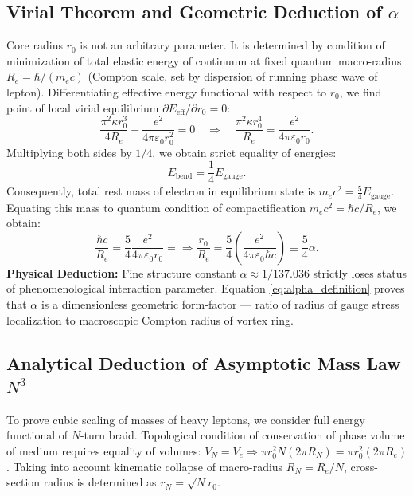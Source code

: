 \documentclass[12pt,a4paper]{article}
\begin{document}
\subsection{Virial Theorem and Geometric Deduction of $\alpha$}
Core radius $r_0$ is not an arbitrary parameter. It is determined by condition of minimization of total elastic energy of continuum at fixed quantum macro-radius $R_e = \hbar/(m_ec)$ (Compton scale, set by dispersion of running phase wave of lepton). Differentiating effective energy functional with respect to $r_0$, we find point of local virial equilibrium $\partial E_{\text{eff}}/\partial r_0 = 0$:
\begin{equation}
    \frac{\pi^2 \kappa r_0^3}{4R_e} - \frac{e^2}{4\pi\varepsilon_0 r_0^2} = 0 \quad \Rightarrow \quad \frac{\pi^2 \kappa r_0^4}{R_e} = \frac{e^2}{4\pi\varepsilon_0 r_0}.
    \label{eq:virial_balance}
\end{equation}
Multiplying both sides by $1/4$, we obtain strict equality of energies:
\begin{equation}
    E_{\text{bend}} = \frac{1}{4}E_{\text{gauge}}.
    \label{eq:energy_equality}
\end{equation}
Consequently, total rest mass of electron in equilibrium state is $m_ec^2 = \frac{5}{4}E_{\text{gauge}}$. Equating this mass to quantum condition of compactification $m_ec^2 = \hbar c/R_e$, we obtain:
\begin{equation}
    \frac{\hbar c}{R_e} = \frac{5}{4}\frac{e^2}{4\pi\varepsilon_0 r_0} = \Rightarrow \frac{r_0}{R_e} = \frac{5}{4} \left( \frac{e^2}{4\pi\varepsilon_0 \hbar c} \right) \equiv \frac{5}{4}\alpha.
    \label{eq:alpha_definition}
\end{equation}
\textbf{Physical Deduction:} Fine structure constant $\alpha \approx 1/137.036$ strictly loses status of phenomenological interaction parameter. Equation \eqref{eq:alpha_definition} proves that $\alpha$ is a dimensionless geometric form-factor --- ratio of radius of gauge stress localization to macroscopic Compton radius of vortex ring.

\subsection{Analytical Deduction of Asymptotic Mass Law $N^3$}
To prove cubic scaling of masses of heavy leptons, we consider full energy functional of $N$-turn braid. Topological condition of conservation of phase volume of medium requires equality of volumes: $V_N = V_e \Rightarrow \pi r_0^2 N (2\pi R_N) = \pi r_0^2 (2\pi R_e)$. Taking into account kinematic collapse of macro-radius $R_N = R_e/N$, cross-section radius is determined as $r_N = \sqrt{N}r_0$.
\end{document}
